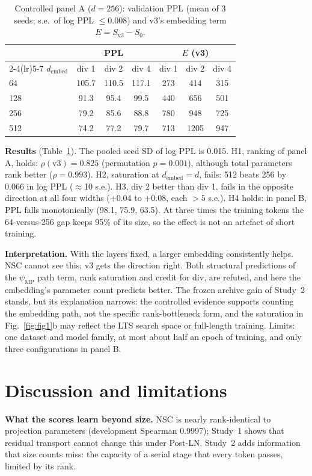 \documentclass[a4paper,12pt]{article}
\newcommand{\psimp}{\psi_{\mathrm{MP}}}
\begin{document}
\begin{table}[t]
\centering
\caption{Controlled panel A ($d=256$): validation PPL (mean of 3 seeds; s.e.\ of log PPL $\le0.008$) and v3's embedding term $E=S_{\text{v3}}-S_0$.}
\label{tab:ctl}
\begin{tabular}{lcccccc}
\toprule
& \multicolumn{3}{c}{PPL} & \multicolumn{3}{c}{$E$ (v3)} \\
\cmidrule(lr){2-4}\cmidrule(lr){5-7}
$d_{\mathrm{embed}}$ & div 1 & div 2 & div 4 & div 1 & div 2 & div 4 \\
\midrule
64 & 105.7 & 110.5 & 117.1 & 273 & 414 & 315 \\
128 & 91.3 & 95.4 & 99.5 & 440 & 656 & 501 \\
256 & 79.2 & 85.6 & 88.8 & 780 & 948 & 725 \\
512 & 74.2 & 77.2 & 79.7 & 713 & 1205 & 947 \\
\bottomrule
\end{tabular}
\end{table}

\textbf{Results} (Table~\ref{tab:ctl}). The pooled seed SD of log PPL is 0.015. H1, ranking of panel A, holds: $\rho(\text{v3})=0.825$ (permutation $p=0.001$), although total parameters rank better ($\rho=0.993$). H2, saturation at $d_{\mathrm{embed}}=d$, fails: 512 beats 256 by 0.066 in log PPL ($\approx$10 s.e.). H3, div 2 better than div 1, fails in the opposite direction at all four widths (+0.04 to +0.08, each $>5$ s.e.). H4 holds: in panel B, PPL falls monotonically (98.1, 75.9, 63.5). At three times the training tokens the 64-versus-256 gap keeps 95\% of its size, so the effect is not an artefact of short training.

\textbf{Interpretation.} With the layers fixed, a larger embedding consistently helps. NSC cannot see this; v3 gets the direction right. Both structural predictions of the $\psimp$ path term, rank saturation and credit for div, are refuted, and here the embedding's parameter count predicts better. The frozen archive gain of Study~2 stands, but its explanation narrows: the controlled evidence supports counting the embedding path, not the specific rank-bottleneck form, and the saturation in Fig.~\ref{fig:fig1}b may reflect the LTS search space or full-length training. Limits: one dataset and model family, at most about half an epoch of training, and only three configurations in panel B.

\section{Discussion and limitations}
\textbf{What the scores learn beyond size.} NSC is nearly rank-identical to projection parameters (development Spearman 0.9997); Study~1 shows that residual transport cannot change this under Post-LN. Study~2 adds information that size counts miss: the capacity of a serial stage that every token passes, limited by its rank.
\end{document}

